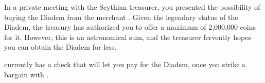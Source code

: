 \documentclass[green]{Kos}
\begin{document}
\name{\gScythiaDiadem{}}

In a private meeting with the Scythian treasurer, you presented the possibility of buying the Diadem from the merchant \cMerchant{}. Given the legendary status of the Diadem, the treasury has authorized you to offer a maximum of 2,000,000 coins for it. However, this is an astronomical sum, and the treasurer fervently hopes you can obtain the Diadem for less.

\cScythiaKing{} currently has a check that will let you pay for the Diadem, once you strike a bargain with \cMerchant{}.
\end{document}
